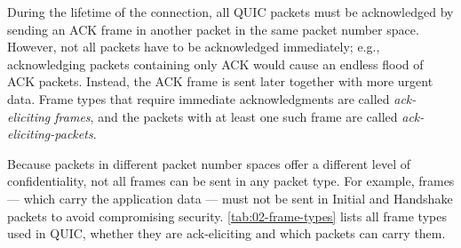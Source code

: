 During the lifetime of the connection, all QUIC packets must be acknowledged by sending an ACK frame
in another packet in the same packet number space. However, not all packets have to be acknowledged
immediately; e.g., acknowledging packets containing only ACK would cause an endless flood of ACK
packets. Instead, the ACK frame is sent later together with more urgent data. Frame types that
require immediate acknowledgments are called \textit{ack-eliciting frames}, and the packets with at
least one such frame are called \textit{\glspl{ack-eliciting-packet}}.

Because packets in different packet number spaces offer a different level of confidentiality, not
all frames can be sent in any packet type. For example, \STREAM{} frames --- which carry the
application data --- must not be sent in Initial and Handshake packets to avoid compromising
security. \autoref{tab:02-frame-types} lists all frame types used in QUIC, whether they are
ack-eliciting and which packets can carry them.

